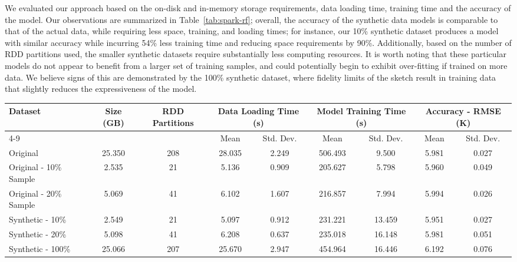 We evaluated our approach based on the on-disk and in-memory storage requirements, data loading time, training time and the accuracy of the model.
Our observations are summarized in Table~\ref{tab:spark-rf}; overall, the accuracy of the synthetic data models is comparable to that of the actual data, while requiring less space, training, and loading times;
for instance, our 10\% synthetic dataset produces a model with similar accuracy while incurring 54\% less training time and reducing space requirements by 90\%. Additionally, based on the number of RDD partitions used, the smaller synthetic datasets require substantially less computing resources.  It is worth noting that these particular models do not appear to benefit from a larger set of training samples, and could potentially begin to exhibit over-fitting if trained on more data.
We believe signs of this are demonstrated by the 100\% synthetic dataset, where fidelity limits of the sketch result in training data that slightly reduces the expressiveness of the model.
%
\begin{table*}[ht!]
    \renewcommand{\arraystretch}{1.2}
    \caption{Comparing Random Forest based regression models generated by Spark MLlib using synthetic vs. real data \vspace{-1em}}
    \label{tab:spark-rf}
    \begin{center}
        \begin{tabularx}{\textwidth}{|X|c|c|c|c|c|c|c|c|}
            \hline
            \multirow{2}{*}{Dataset} & \multirow{2}{*}{Size (GB)} & \multirow{2}{*}{RDD Partitions} & \multicolumn{2}{c|}{\cellcolor[gray]{0.7}Data Loading Time (s)} &\multicolumn{2}{c|}{\cellcolor[gray]{0.7}Model Training Time (s)} & \multicolumn{2}{c|}{\cellcolor[gray]{0.7}Accuracy - RMSE (K)}\\
            \cline{4-9}
             & & & \cellcolor[gray]{0.9}Mean & \cellcolor[gray]{0.9}Std. Dev.  &  \cellcolor[gray]{0.9}Mean & \cellcolor[gray]{0.9}Std. Dev. &  \cellcolor[gray]{0.9}Mean & \cellcolor[gray]{0.9}Std. Dev. \\
            \hline
            Original & 25.350 & 208 & 28.035 & 2.249 & 506.493 & 9.500 & 5.981 & 0.027 \\
            \hline
            Original - 10\% Sample & 2.535 & 21 & 5.136 & 0.909 & 205.627 & 5.798 & 5.960  & 0.049 \\
            \hline
            Original - 20\% Sample & 5.069 & 41 & 6.102 & 1.607 & 216.857 & 7.994 & 5.994 & 0.026 \\
            \hline
            Synthetic - 10\% & 2.549 & 21 & 5.097 & 0.912 & 231.221 & 13.459 & 5.951 & 0.027 \\
            \hline
            Synthetic - 20\% & 5.098 & 41 & 6.208 & 0.637 & 235.018 & 16.148 & 5.981 & 0.051 \\
            \hline
            Synthetic - 100\% & 25.066 & 207 & 25.670 & 2.947 & 454.964 & 16.446 & 6.192 & 0.076 \\
            \hline
        \end{tabularx}
    \end{center}
    \vspace{-1em}
\end{table*}
